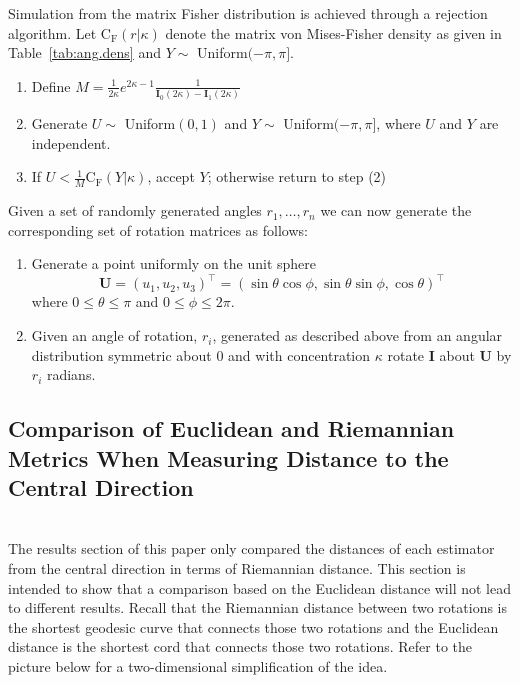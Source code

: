 Simulation from the matrix Fisher distribution is achieved through a rejection algorithm.  Let  $\mathrm{C_F}(r|\kappa)$ denote the matrix von Mises-Fisher density as given in Table~\ref{tab:ang.dens} and $Y\sim$ Uniform$(-\pi,\pi]$.

\begin{enumerate}
\item Define $M=\frac{1}{2\kappa}e^{2\kappa - 1}\frac{1}{\mathbf{I}_0(2\kappa)-\mathbf{I}_1(2\kappa)}$
\item Generate $U\sim$ Uniform$(0,1)$ and $Y\sim$ Uniform$(-\pi,\pi]$, where $U$ and $Y$ are independent.
\item If $U<\frac{1}{M}\mathrm{C_F}(Y|\kappa)$, accept $Y$; otherwise return to step (2)
\end{enumerate}

Given a set of randomly generated angles $r_1,\ldots, r_n$ we can now generate the corresponding set of rotation matrices as follows:
\begin{enumerate}
\item Generate a point uniformly on the unit sphere
$$\bm{U}=(u_1,u_2,u_3)^\top=(\sin\theta\cos\phi,\sin\theta\sin\phi,\cos\theta)^\top$$
where  $0\leq \theta\leq \pi$ and $0\leq \phi\leq 2\pi$.
\item Given an angle of rotation, $r_i$, generated as described above from an angular distribution symmetric about 0 and with concentration $\kappa$ rotate $\bm{I}$ about $\bm{U}$ by $r_i$ radians.
\end{enumerate}

\subsection{Comparison of Euclidean and Riemannian Metrics When Measuring Distance to the Central Direction}\hfill\\

The results section of this paper only compared the distances of each estimator from the central direction in terms of Riemannian distance.  This section is intended to show that a comparison based on the Euclidean distance will not lead to different results.  Recall that the Riemannian distance between two rotations is the shortest geodesic curve that connects those two rotations and the Euclidean distance is the shortest cord that connects those two rotations.  Refer to the picture below for a two-dimensional simplification of the idea.

\begin{center}
\end{center}

